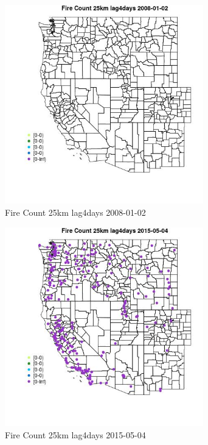 \begin{figure} 
\centering  
\includegraphics[width=0.77\textwidth]{Code_Outputs/Report_ML_input_PM25_Step4_part_e_de_duplicated_aves_compiled_2019-05-18wNAs_MapObsFire_Count_25km_lag4days2008-01-02.jpg} 
\caption{\label{fig:Report_ML_input_PM25_Step4_part_e_de_duplicated_aves_compiled_2019-05-18wNAsMapObsFire_Count_25km_lag4days2008-01-02}Fire Count 25km lag4days 2008-01-02} 
\end{figure} 
 

\begin{figure} 
\centering  
\includegraphics[width=0.77\textwidth]{Code_Outputs/Report_ML_input_PM25_Step4_part_e_de_duplicated_aves_compiled_2019-05-18wNAs_MapObsFire_Count_25km_lag4days2015-05-04.jpg} 
\caption{\label{fig:Report_ML_input_PM25_Step4_part_e_de_duplicated_aves_compiled_2019-05-18wNAsMapObsFire_Count_25km_lag4days2015-05-04}Fire Count 25km lag4days 2015-05-04} 
\end{figure} 
 

